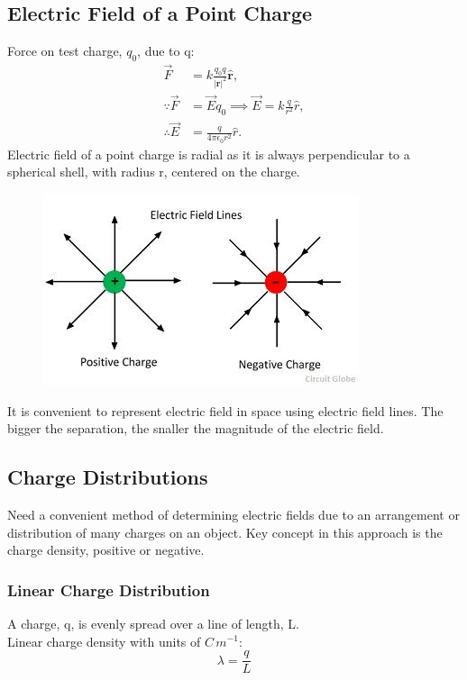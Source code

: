 \documentclass[a4paper, 11pt, normalem]{report}
\begin{document}
\chapter{}
\section{Electric Field of a Point Charge}
Force on test charge, $q_{0}$, due to q:
\begin{align}
    \vec{F} &= k\frac{q_{0}q}{|\mathbf{r}|^{2}} \mathbf{\hat{r}}, \\
    \because \vec{F} &= \vec{E}q_{0} \implies \vec{E} = k\frac{q}{r^{2}}\hat{r}, \\ 
    \therefore \vec{E} &= \frac{q}{4\pi\epsilon_{0}r^{2}}\hat{r}.
\end{align}
Electric field of a point charge is radial as it is always perpendicular to a spherical shell, with radius r, centered on the charge.
\begin{figure}[H]
    \centering
    \includegraphics{electric-field-line.jpg}
\end{figure}
It is convenient to represent electric field in space using electric field lines. The bigger the separation, the snaller the magnitude of the electric field.

\section{Charge Distributions}
Need a convenient method of determining electric fields due to an arrangement or distribution of many charges on an object. 
Key concept in this approach is the charge density, positive or negative.

\subsection{Linear Charge Distribution}
A charge, q, is evenly spread over a line of length, L. \\
Linear charge density with units of $C\,m^{-1}$:
\begin{equation}
    \lambda = \frac{q}{L}
\end{equation}
\end{document}
